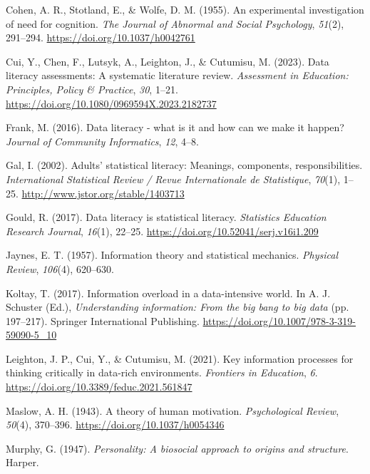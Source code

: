\documentclass[
  12pt,
  a4paper,
  twoside]{article}
\newlength{\cslhangindent}
\newenvironment{CSLReferences}[2] %
 {\begin{list}{}{%
  \setlength{\itemindent}{0pt}
  \setlength{\leftmargin}{0pt}
  \setlength{\parsep}{0pt}
  \ifodd #1
   \setlength{\leftmargin}{\cslhangindent}
   \setlength{\itemindent}{-1\cslhangindent}
  \fi
  \setlength{\itemsep}{#2\baselineskip}}}
 {\end{list}}
\begin{document}
\begin{CSLReferences}{1}{0}
Cohen, A. R., Stotland, E., \& Wolfe, D. M. (1955). An experimental investigation of need for cognition. \emph{The Journal of Abnormal and Social Psychology}, \emph{51}(2), 291--294. \url{https://doi.org/10.1037/h0042761}

Cui, Y., Chen, F., Lutsyk, A., Leighton, J., \& Cutumisu, M. (2023). Data literacy assessments: A systematic literature review. \emph{Assessment in Education: Principles, Policy \& Practice}, \emph{30}, 1--21. \url{https://doi.org/10.1080/0969594X.2023.2182737}

Frank, M. (2016). Data literacy - what is it and how can we make it happen? \emph{Journal of Community Informatics}, \emph{12}, 4--8.

Gal, I. (2002). Adults' statistical literacy: Meanings, components, responsibilities. \emph{International Statistical Review / Revue Internationale de Statistique}, \emph{70}(1), 1--25. \url{http://www.jstor.org/stable/1403713}

Gould, R. (2017). Data literacy is statistical literacy. \emph{Statistics Education Research Journal}, \emph{16}(1), 22--25. \url{https://doi.org/10.52041/serj.v16i1.209}

Jaynes, E. T. (1957). Information theory and statistical mechanics. \emph{Physical Review}, \emph{106}(4), 620--630.

Koltay, T. (2017). Information overload in a data-intensive world. In A. J. Schuster (Ed.), \emph{Understanding information: From the big bang to big data} (pp. 197--217). Springer International Publishing. \url{https://doi.org/10.1007/978-3-319-59090-5_10}

Leighton, J. P., Cui, Y., \& Cutumisu, M. (2021). Key information processes for thinking critically in data-rich environments. \emph{Frontiers in Education}, \emph{6}. \url{https://doi.org/10.3389/feduc.2021.561847}

Maslow, A. H. (1943). A theory of human motivation. \emph{Psychological Review}, \emph{50}(4), 370--396. \url{https://doi.org/10.1037/h0054346}

Murphy, G. (1947). \emph{Personality: A biosocial approach to origins and structure}. Harper.


\end{CSLReferences}
\end{document}
